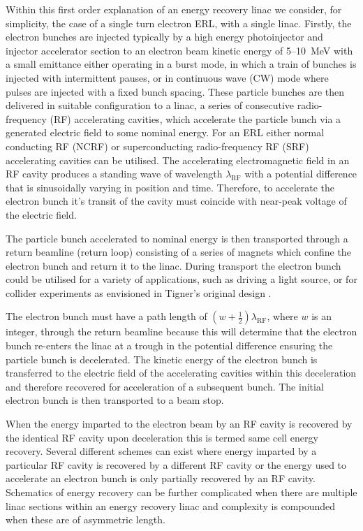 \documentclass[../main.tex]{subfiles}
\begin{document}
Within this first order explanation of an energy recovery linac we consider, for simplicity, the case of a single turn electron ERL, with a single linac. Firstly, the electron bunches are injected typically by a high energy photoinjector and injector accelerator section to an electron beam kinetic energy of 5--10~\si{\mega\electronvolt} with a small emittance either operating in a burst mode, in which a train of bunches is injected with intermittent pauses, or in continuous wave (CW) mode where pulses are injected with a fixed bunch spacing. These particle bunches are then delivered in suitable configuration to a linac, a series of consecutive radio-frequency (RF) accelerating cavities, which accelerate the particle bunch via a generated electric field to some nominal energy. For an ERL either normal conducting RF (NCRF) or superconducting radio-frequency RF (SRF) accelerating cavities can be utilised. The accelerating electromagnetic field in an RF cavity produces a standing wave of wavelength $\lambda_{\mathrm{RF}}$ with a potential difference that is sinusoidally varying in position and time. Therefore, to accelerate the electron bunch it's transit of the cavity must coincide with near-peak voltage of the electric field.   

The particle bunch accelerated to nominal energy is then transported through a return beamline (return loop) consisting of a series of magnets which confine the electron bunch and return it to the linac. During transport the electron bunch could be utilised for a variety of applications, such as driving a light source, or for collider experiments as envisioned in Tigner's original design \cite{tigner1965possible}.

The electron bunch must have a path length of $\left(w+\frac{1}{2}\right)\lambda_{\mathrm{RF}}$, where $w$ is an integer, through the return beamline because this will determine that the electron bunch re-enters the linac at a trough in the potential difference ensuring the particle bunch is decelerated. The kinetic energy of the electron bunch is transferred to the electric field of the accelerating cavities within this deceleration and therefore recovered for acceleration of a subsequent bunch. The initial electron bunch is then transported to a beam stop.

When the energy imparted to the electron beam by an RF cavity is recovered by the identical RF cavity upon deceleration this is termed same cell energy recovery. Several different schemes can exist where energy imparted by a particular RF cavity is recovered by a different RF cavity or the energy used to accelerate an electron bunch is only partially recovered by an RF cavity. Schematics of energy recovery can be further complicated when there are multiple linac sections within an energy recovery linac and complexity is compounded when these are of asymmetric length.     
\end{document}
